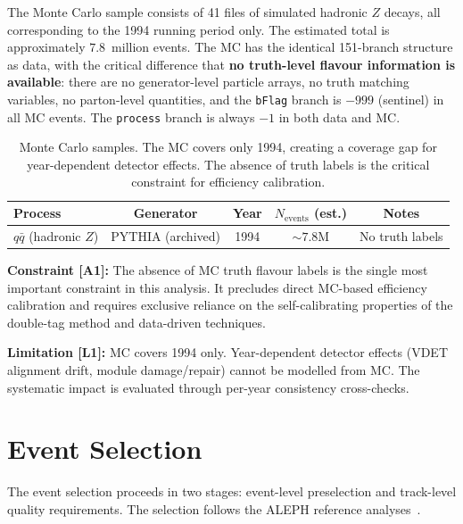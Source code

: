\documentclass[11pt,a4paper]{article}
\begin{document}
The Monte Carlo sample consists of 41 files of simulated hadronic $Z$ decays,
all corresponding to the 1994 running period only. The estimated total is
approximately $7.8$~million events. The MC has the identical 151-branch structure
as data, with the critical difference that \textbf{no truth-level flavour information
is available}: there are no generator-level particle arrays, no truth matching
variables, no parton-level quantities, and the \texttt{bFlag} branch is $-999$
(sentinel) in all MC events. The \texttt{process} branch is always $-1$ in both
data and MC.

\begin{table}[htbp]
\centering
\caption{Monte Carlo samples. The MC covers only 1994, creating a coverage gap
for year-dependent detector effects. The absence of truth labels is the critical
constraint for efficiency calibration.}
\label{tab:mc_samples}
\begin{tabular}{lcccc}
\toprule
Process & Generator & Year & $N_\mathrm{events}$ (est.) & Notes \\
\midrule
$q\bar{q}$ (hadronic $Z$) & PYTHIA (archived) & 1994 & $\sim 7.8$M & No truth labels \\
\bottomrule
\end{tabular}
\end{table}

\noindent\textbf{Constraint [A1]:} The absence of MC truth flavour labels is the
single most important constraint in this analysis. It precludes direct MC-based
efficiency calibration and requires exclusive reliance on the self-calibrating
properties of the double-tag method and data-driven techniques.

\noindent\textbf{Limitation [L1]:} MC covers 1994 only. Year-dependent detector
effects (VDET alignment drift, module damage/repair) cannot be modelled from MC.
The systematic impact is evaluated through per-year consistency cross-checks.

\FloatBarrier
{}
\section{Event Selection}
\label{sec:selection}

The event selection proceeds in two stages: event-level preselection and track-level
quality requirements. The selection follows the ALEPH reference analyses~\cite{ALEPH:Rb:1996, ALEPH:AFBb}.
\end{document}

